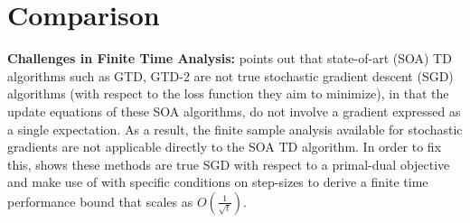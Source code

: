 \section{Comparison}
\textbf{Challenges in Finite Time Analysis:} \cite{gtdfinite} points out that state-of-art (SOA) TD algorithms such as GTD, GTD-2 are not true stochastic gradient descent (SGD) algorithms (with respect to the loss function they aim to minimize), in that the update equations of these SOA algorithms, do not involve a gradient expressed as a single expectation. As a result, the finite sample analysis available for stochastic gradients are not applicable directly to the SOA TD algorithm. In order to fix this, \cite{gtdfinite} shows these methods are true SGD with respect to a primal-dual objective and make use of \cite{nemirovski} with specific conditions on step-sizes to derive a finite time performance bound that scales as $O(\frac{1}{\sqrt{t}})$.\par
\begin{comment}
\textbf{Adaptive Step-sizes and Speed-up terms:} Efforts have been made to improve the performance of TD algorithms, by changing the step-sizes adaptively \cite{dabney} or adding speed-up terms \cite{sqlpaper}. Whilst adaptive step-sizes can be guaranteed to improve, their effect on the finite time performance is not known. In the case of full state representation (tabular representation), the speedy Q-learning (SQL) algorithm adds a correction/speed-up term to achieve an $O(\frac{1}{\sqrt{t}})$ finite time performance. The analysis in this paper shows that the idea used by SQL cannot be extended effectively to the case when features are used.\par
\end{comment}

